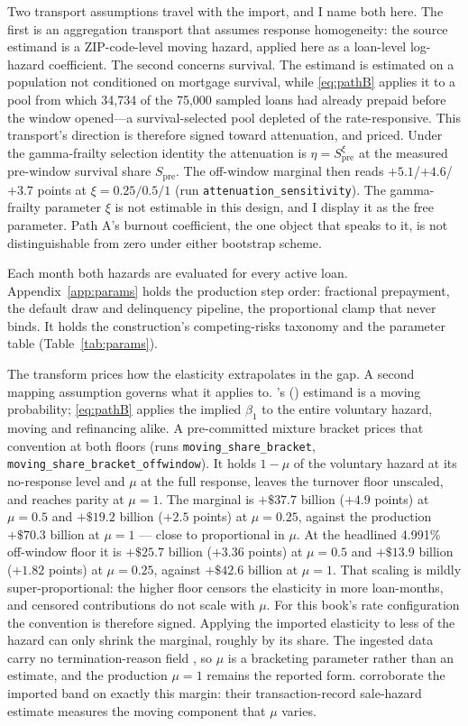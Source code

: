 \documentclass[12pt]{article}
\newcommand{\citepos}[1]{\citeauthor{#1}'s (\citeyear{#1})}
\begin{document}
Two transport assumptions travel with the import, and I name both here. The first is an aggregation transport that assumes response homogeneity: the source estimand is a ZIP-code-level moving hazard, applied here as a loan-level log-hazard coefficient. The second concerns survival. The estimand is estimated on a population not conditioned on mortgage survival, while \eqref{eq:pathB} applies it to a pool from which 34,734 of the 75,000 sampled loans had already prepaid before the window opened---a survival-selected pool depleted of the rate-responsive. This transport's direction is therefore signed toward attenuation, and priced. Under the gamma-frailty selection identity the attenuation is $\eta = S_{\mathrm{pre}}^{\xi}$ at the measured pre-window survival share $S_{\mathrm{pre}}$. The off-window marginal then reads $+5.1$/$+4.6$/$+3.7$ points at $\xi = 0.25/0.5/1$ (run \texttt{attenuation\_sensitivity}). The gamma-frailty parameter $\xi$ is not estimable in this design, and I display it as the free parameter. Path A's burnout coefficient, the one object that speaks to it, is not distinguishable from zero under either bootstrap scheme.

Each month both hazards are evaluated for every active loan. Appendix~\ref{app:params} holds the production step order: fractional prepayment, the default draw and delinquency pipeline, the proportional clamp that never binds. It holds the construction's competing-risks taxonomy and the parameter table (Table~\ref{tab:params}).

The transform prices how the elasticity extrapolates in the gap. A second mapping assumption governs what it applies to. \citepos{liebersohn2024} estimand is a moving probability; \eqref{eq:pathB} applies the implied $\beta_1$ to the entire voluntary hazard, moving and refinancing alike. A pre-committed mixture bracket prices that convention at both floors (runs \texttt{moving\_share\_bracket}, \texttt{moving\_share\_bracket\_offwindow}). It holds $1-\mu$ of the voluntary hazard at its no-response level and $\mu$ at the full response, leaves the turnover floor unscaled, and reaches parity at $\mu = 1$. The marginal is $+\$37.7$ billion ($+4.9$ points) at $\mu = 0.5$ and $+\$19.2$ billion ($+2.5$ points) at $\mu = 0.25$, against the production $+\$70.3$ billion at $\mu = 1$ --- close to proportional in $\mu$. At the headlined 4.991\% off-window floor it is $+\$25.7$ billion ($+3.36$ points) at $\mu = 0.5$ and $+\$13.9$ billion ($+1.82$ points) at $\mu = 0.25$, against $+\$42.6$ billion at $\mu = 1$. That scaling is mildly super-proportional: the higher floor censors the elasticity in more loan-months, and censored contributions do not scale with $\mu$. For this book's rate configuration the convention is therefore signed. Applying the imported elasticity to less of the hazard can only shrink the marginal, roughly by its share. The ingested data carry no termination-reason field \citep[cf.][on the refinancing-versus-moving mix]{amromin2020}, so $\mu$ is a bracketing parameter rather than an estimate, and the production $\mu = 1$ remains the reported form. \citet{graybill2026} corroborate the imported band on exactly this margin: their transaction-record sale-hazard estimate measures the moving component that $\mu$ varies.
\end{document}
